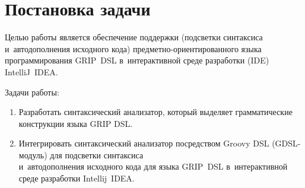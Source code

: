 \section{Постановка задачи} \label{sub21}

Целью работы является обеспечение поддержки (подсветки синтаксиса и~автодополнения исходного кода) предметно-ориентированного языка программирования GRIP~DSL в~интерактивной среде разработки (IDE) IntelliJ~IDEA.

Задачи работы: 

\begin{enumerate} 
\item{Разработать синтаксический анализатор, который выделяет грамматические конструкции языка GRIP DSL.}
\item{Интегрировать синтаксический анализатор посредством Groovy DSL (GDSL-модуль) для подсветки синтаксиса \\ и~автодополнения исходного кода для языка GRIP~DSL в~интерактивной среде разработки Intellij~IDEA.}
\end{enumerate} 
